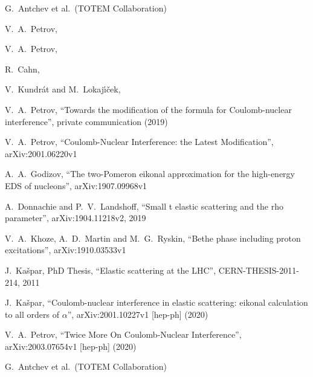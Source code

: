 \documentclass{appolb}
\begin{document}
\begin{thebibliography}{9}

	G.~Antchev et al.~(TOTEM Collaboration)

	V.~A.~Petrov,

	V.~A.~Petrov,

	R.~Cahn,

	V.~Kundr\'{a}t and M.~Lokaj\'{\i}\v{c}ek,

	V.~A.~Petrov,
	``Towards the modification of the formula for Coulomb-nuclear interference'',
	private communication (2019)

	V.~A.~Petrov,
	``Coulomb-Nuclear Interference: the Latest Modification'',
	arXiv:2001.06220v1

	A.~A.~Godizov,
	``The two-Pomeron eikonal approximation for the high-energy EDS of nucleons'',
	arXiv:1907.09968v1

	A.~Donnachie and  P.~V.~Landshoff,
	``Small t elastic scattering and the rho parameter'',
	arXiv:1904.11218v2,
	2019

	V.~A.~Khoze, A.~D.~Martin and M.~G.~Ryskin,
	``Bethe phase including proton excitations'',
	arXiv:1910.03533v1
	
	J.~Ka\v{s}par,
	PhD Thesis,
	``Elastic scattering at the LHC'',
	CERN-THESIS-2011-214,
	2011

	J.~Ka\v{s}par,
	``Coulomb-nuclear interference in elastic scattering: eikonal calculation to all orders of $\alpha$'',
	arXiv:2001.10227v1 [hep-ph] (2020)

	V.~A.~Petrov,
	``Twice More On Coulomb-Nuclear Interference'',
	arXiv:2003.07654v1 [hep-ph] (2020)

	G.~Antchev et al.~(TOTEM Collaboration)


\end{thebibliography}
\end{document}
